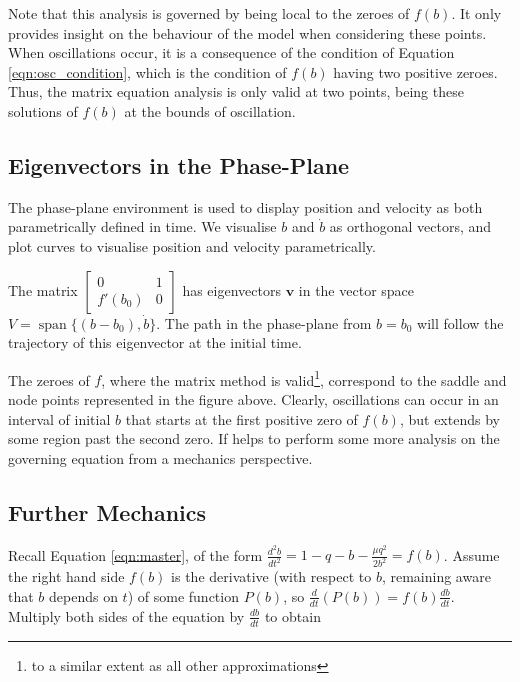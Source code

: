 \documentclass{article}
\begin{document}
Note that this analysis is governed by being local to the zeroes of $f(b)$.
It only provides insight on the behaviour of the model when considering these points.
When oscillations occur, it is a consequence of the condition of Equation \ref{eqn:osc_condition},
which is the condition of $f(b)$ having two positive zeroes.
Thus, the matrix equation analysis is only valid at two points,
being these solutions of $f(b)$ at the bounds of oscillation.


\subsection{Eigenvectors in the Phase-Plane}

The phase-plane environment is used to display position and velocity as both parametrically defined in time.
We visualise $b$ and $\dot{b}$ as orthogonal vectors, and plot curves to visualise position and velocity parametrically.


The matrix $\begin{bmatrix}
	0 & 1 \\
	f'(b_0) & 0
\end{bmatrix}$ has eigenvectors $\mathbf{v}$ in the vector space $V = \operatorname{span}\{(b-b_0),\dot{b}\}$.
The path in the phase-plane from $b=b_0$ will follow the trajectory of this eigenvector at the initial time.


The zeroes of $f$, where the matrix method is valid\footnote{to a similar extent as all other approximations},
correspond to the saddle and node points represented in the figure above. %
Clearly, oscillations can occur in an interval of initial $b$ that starts at the first positive zero of $f(b)$,
but extends by some region past the second zero.
If helps to perform some more analysis on the governing equation from a mechanics perspective.

\subsection{Further Mechanics}

Recall Equation \ref{eqn:master}, of the form $\frac{d^2b}{dt^2} = 1 - q - b - \frac{\mu q^2}{2 b^2} = f(b)$.
Assume the right hand side $f(b)$ is the derivative (with respect to $b$, remaining aware that $b$ depends on $t$) of some function $P(b)$,
so $\frac{d}{dt}\left(P(b)\right) = f(b)\frac{db}{dt}.$ %
Multiply both sides of the equation by $\frac{db}{dt}$ to obtain
\end{document}

